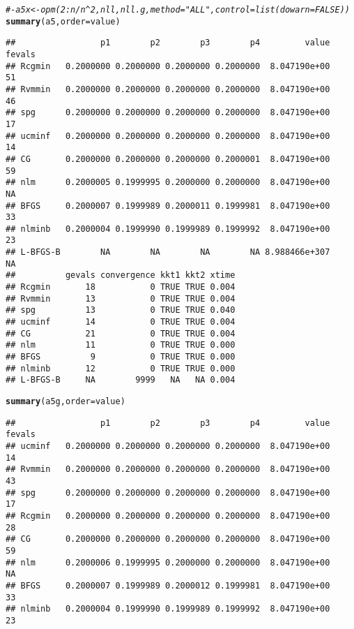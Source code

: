 \documentclass[11pt]{article}\usepackage[]{graphicx}\usepackage[]{color}
\makeatletter
\newcommand{\hlcom}[1]{\textcolor[rgb]{0.678,0.584,0.686}{\textit{#1}}}%
\newcommand{\hlstd}[1]{\textcolor[rgb]{0.345,0.345,0.345}{#1}}%
\newcommand{\hlkwc}[1]{\textcolor[rgb]{0.333,0.667,0.333}{#1}}%
\newcommand{\hlkwd}[1]{\textcolor[rgb]{0.737,0.353,0.396}{\textbf{#1}}}%
\newenvironment{kframe}{%
 \def\at@end@of@kframe{}%
 \ifinner\ifhmode%
  \def\at@end@of@kframe{\end{minipage}}%
  \begin{minipage}{\columnwidth}%
 \fi\fi%
 \def\FrameCommand##1{\hskip\@totalleftmargin \hskip-\fboxsep
 \colorbox{shadecolor}{##1}\hskip-\fboxsep
     \hskip-\linewidth \hskip-\@totalleftmargin \hskip\columnwidth}%
 \MakeFramed {\advance\hsize-\width
   \@totalleftmargin\z@ \linewidth\hsize
   \@setminipage}}%
 {\par\unskip\endMakeFramed%
 \at@end@of@kframe}
\newenvironment{knitrout}{}{} %
\makeatother
\begin{document}
\begin{knitrout}
\begin{kframe}
{\ttfamily\noindent\color{warningcolor}{\#\# Warning in optimr(par, fn, gr, method = meth, lower = lower, upper = upper, : optimr: optim() with bounds ONLY uses L-BFGS-B}}\begin{alltt}
\hlcom{#- a5x <- opm(2:n/n^2, nll, nll.g, method="ALL", control=list(dowarn=FALSE))}
\hlkwd{summary}\hlstd{(a5,}\hlkwc{order}\hlstd{=value)}
\end{alltt}
\begin{verbatim}
##                 p1        p2        p3        p4         value fevals
## Rcgmin   0.2000000 0.2000000 0.2000000 0.2000000  8.047190e+00     51
## Rvmmin   0.2000000 0.2000000 0.2000000 0.2000000  8.047190e+00     46
## spg      0.2000000 0.2000000 0.2000000 0.2000000  8.047190e+00     17
## ucminf   0.2000000 0.2000000 0.2000000 0.2000000  8.047190e+00     14
## CG       0.2000000 0.2000000 0.2000000 0.2000001  8.047190e+00     59
## nlm      0.2000005 0.1999995 0.2000000 0.2000000  8.047190e+00     NA
## BFGS     0.2000007 0.1999989 0.2000011 0.1999981  8.047190e+00     33
## nlminb   0.2000004 0.1999990 0.1999989 0.1999992  8.047190e+00     23
## L-BFGS-B        NA        NA        NA        NA 8.988466e+307     NA
##          gevals convergence kkt1 kkt2 xtime
## Rcgmin       18           0 TRUE TRUE 0.004
## Rvmmin       13           0 TRUE TRUE 0.004
## spg          13           0 TRUE TRUE 0.040
## ucminf       14           0 TRUE TRUE 0.004
## CG           21           0 TRUE TRUE 0.004
## nlm          11           0 TRUE TRUE 0.000
## BFGS          9           0 TRUE TRUE 0.000
## nlminb       12           0 TRUE TRUE 0.000
## L-BFGS-B     NA        9999   NA   NA 0.004
\end{verbatim}
\begin{alltt}
\hlkwd{summary}\hlstd{(a5g,}\hlkwc{order}\hlstd{=value)}
\end{alltt}
\begin{verbatim}
##                 p1        p2        p3        p4         value fevals
## ucminf   0.2000000 0.2000000 0.2000000 0.2000000  8.047190e+00     14
## Rvmmin   0.2000000 0.2000000 0.2000000 0.2000000  8.047190e+00     43
## spg      0.2000000 0.2000000 0.2000000 0.2000000  8.047190e+00     17
## Rcgmin   0.2000000 0.2000000 0.2000000 0.2000000  8.047190e+00     28
## CG       0.2000000 0.2000000 0.2000000 0.2000000  8.047190e+00     59
## nlm      0.2000006 0.1999995 0.2000000 0.2000000  8.047190e+00     NA
## BFGS     0.2000007 0.1999989 0.2000012 0.1999981  8.047190e+00     33
## nlminb   0.2000004 0.1999990 0.1999989 0.1999992  8.047190e+00     23

\end{verbatim}
\end{kframe}
\end{knitrout}
\end{document}
